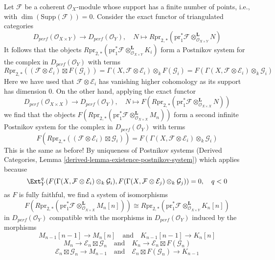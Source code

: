 \medskip\noindent
Let $\mathcal{F}$ be a coherent $\mathcal{O}_X$-module whose support
has a finite number of points, i.e., with $\dim(\text{Supp}(\mathcal{F})) = 0$.
Consider the exact functor of triangulated categories
$$
D_{perf}(\mathcal{O}_{X \times Y})
\longrightarrow
D_{perf}(\mathcal{O}_Y),\quad
N \longmapsto R\text{pr}_{2, *}(\text{pr}_1^*\mathcal{F}
\otimes^\mathbf{L}_{\mathcal{O}_{X \times Y}} N)
$$
It follows that the objects $R\text{pr}_{2, *}(\text{pr}_1^*\mathcal{F}
\otimes^\mathbf{L}_{\mathcal{O}_{X \times Y}} K_i)$
form a Postnikov system for the complex in
$D_{perf}(\mathcal{O}_Y)$ with terms
$$
R\text{pr}_{2, *}(
(\mathcal{F} \otimes \mathcal{E}_i) \boxtimes F(\mathcal{G}_i)) =
\Gamma(X, \mathcal{F} \otimes \mathcal{E}_i) \otimes_k F(\mathcal{G}_i) =
F(\Gamma(X, \mathcal{F} \otimes \mathcal{E}_i) \otimes_k \mathcal{G}_i)
$$
Here we have used that $\mathcal{F} \otimes \mathcal{E}_i$ has
vanishing higher cohomology as its support has dimension $0$.
On the other hand, applying the exact functor
$$
D_{perf}(\mathcal{O}_{X \times X})
\longrightarrow
D_{perf}(\mathcal{O}_Y),\quad
N \longmapsto F(R\text{pr}_{2, *}(\text{pr}_1^*\mathcal{F}
\otimes^\mathbf{L}_{\mathcal{O}_{X \times X}} N))
$$
we find that the objects
$F(R\text{pr}_{2, *}(\text{pr}_1^*\mathcal{F}
\otimes^\mathbf{L}_{\mathcal{O}_{X \times X}} M_n))$
form a second infinite Postnikov system
for the complex in $D_{perf}(\mathcal{O}_Y)$ with terms
$$
F(R\text{pr}_{2, *}(
(\mathcal{F} \otimes \mathcal{E}_i) \boxtimes \mathcal{G}_i)) =
F(\Gamma(X, \mathcal{F} \otimes \mathcal{E}_i) \otimes_k \mathcal{G}_i)
$$
This is the same as before! By uniqueness of Postnikov systems
(Derived Categories, Lemma \ref{derived-lemma-existence-postnikov-system})
which applies because
$$
\Ext^q_Y(
F(\Gamma(X, \mathcal{F} \otimes \mathcal{E}_i) \otimes_k \mathcal{G}_i),
F(\Gamma(X, \mathcal{F} \otimes \mathcal{E}_j) \otimes_k \mathcal{G}_j)) = 0,
\quad q < 0
$$
as $F$ is fully faithful, we find a system of isomorphisms
$$
F(R\text{pr}_{2, *}(\text{pr}_1^*\mathcal{F}
\otimes^\mathbf{L}_{\mathcal{O}_{X \times X}} M_n[n]))
\cong
R\text{pr}_{2, *}(\text{pr}_1^*\mathcal{F}
\otimes^\mathbf{L}_{\mathcal{O}_{X \times Y}} K_n[n])
$$
in $D_{perf}(\mathcal{O}_Y)$ compatible with the morphisms in
$D_{perf}(\mathcal{O}_Y)$ induced by the morphisms
$$
M_{n - 1}[n - 1] \to M_n[n]
\quad\text{and}\quad
K_{n - 1}[n - 1] \to K_n[n]
$$
$$
M_n \to \mathcal{E}_n \boxtimes \mathcal{G}_n
\quad\text{and}\quad
K_n \to \mathcal{E}_n \boxtimes F(\mathcal{G}_n)
$$
$$
\mathcal{E}_n \boxtimes \mathcal{G}_n \to M_{n - 1}
\quad\text{and}\quad
\mathcal{E}_n \boxtimes F(\mathcal{G}_n) \to K_{n - 1}
$$
